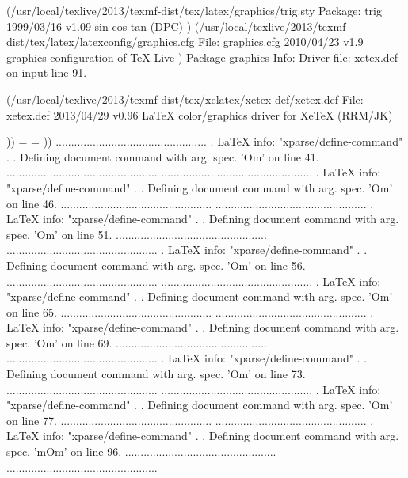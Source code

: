 (/usr/local/texlive/2013/texmf-dist/tex/latex/graphics/trig.sty
Package: trig 1999/03/16 v1.09 sin cos tan (DPC)
)
(/usr/local/texlive/2013/texmf-dist/tex/latex/latexconfig/graphics.cfg
File: graphics.cfg 2010/04/23 v1.9 graphics configuration of TeX Live
)
Package graphics Info: Driver file: xetex.def on input line 91.

(/usr/local/texlive/2013/texmf-dist/tex/xelatex/xetex-def/xetex.def
File: xetex.def 2013/04/29 v0.96 LaTeX color/graphics driver for XeTeX (RRM/JK)

))
\Gin@req@height=
\Gin@req@width=
))
.................................................
. LaTeX info: "xparse/define-command"
. 
. Defining document command \fontspec with arg. spec. 'O{}m' on line 41.
.................................................
.................................................
. LaTeX info: "xparse/define-command"
. 
. Defining document command \setmainfont with arg. spec. 'O{}m' on line 46.
.................................................
.................................................
. LaTeX info: "xparse/define-command"
. 
. Defining document command \setsansfont with arg. spec. 'O{}m' on line 51.
.................................................
.................................................
. LaTeX info: "xparse/define-command"
. 
. Defining document command \setmonofont with arg. spec. 'O{}m' on line 56.
.................................................
.................................................
. LaTeX info: "xparse/define-command"
. 
. Defining document command \setmathrm with arg. spec. 'O{}m' on line 65.
.................................................
.................................................
. LaTeX info: "xparse/define-command"
. 
. Defining document command \setboldmathrm with arg. spec. 'O{}m' on line 69.
.................................................
.................................................
. LaTeX info: "xparse/define-command"
. 
. Defining document command \setmathsf with arg. spec. 'O{}m' on line 73.
.................................................
.................................................
. LaTeX info: "xparse/define-command"
. 
. Defining document command \setmathtt with arg. spec. 'O{}m' on line 77.
.................................................
.................................................
. LaTeX info: "xparse/define-command"
. 
. Defining document command \newfontfamily with arg. spec. 'mO{}m' on line 96.
.................................................
.................................................
